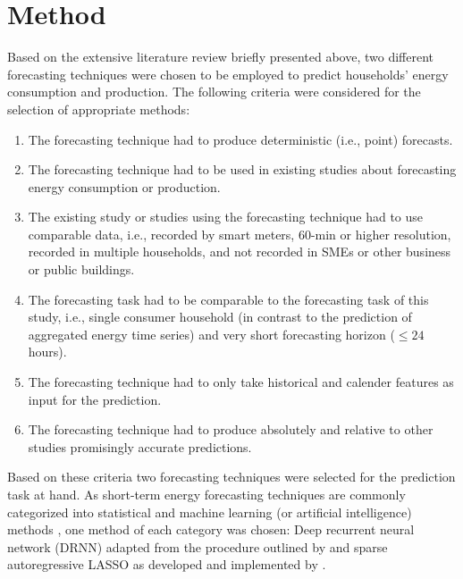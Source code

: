 
\section{Method}\label{Sec:Method}

Based on the extensive literature review briefly presented above, two different forecasting techniques were chosen to be employed to predict households' energy consumption and production. The following criteria were considered for the selection of appropriate methods: 

\begin{enumerate}
    \item The forecasting technique had to produce deterministic (i.e., point) forecasts.
    \item The forecasting technique had to be used in existing studies about forecasting energy consumption or production.
    \item The existing study or studies using the forecasting technique had to use comparable data, i.e., recorded by smart meters, 60-min or higher resolution, recorded in multiple households, and not recorded in SMEs or other business or public buildings.
    \item The forecasting task had to be comparable to the forecasting task of this study, i.e., single consumer household (in contrast to the prediction of aggregated energy time series) and very short forecasting horizon ($\leq 24$ hours).
    \item The forecasting technique had to only take historical and calender features as input for the prediction.
    \item The forecasting technique had to produce absolutely and relative to other studies promisingly accurate predictions.
\end{enumerate}

\noindent Based on these criteria two forecasting techniques were selected for the prediction task at hand. As short-term energy forecasting techniques are commonly categorized into statistical and machine learning (or artificial intelligence) methods \citep{Bansal:2015,Diagne:2013,Gan:2017}, one method of each category was chosen: Deep recurrent neural network (DRNN) adapted from the procedure outlined by \citet{Shi:2017} and sparse autoregressive LASSO as developed and implemented by \citet{Li:2017}.%

